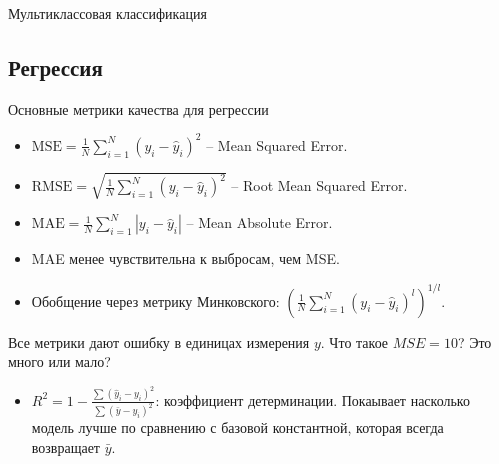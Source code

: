 \documentclass[9pt]{beamer}
\begin{document}
\begin{frame}{Мультиклассовая классификация}
\end{frame}

\subsection{Регрессия}

\begin{frame}{Основные метрики качества для регрессии}
\begin{itemize}
    \item $\text{MSE} = \frac{1}{N}\sum\limits_{i=1}^N (y_i - \hat y_i)^2$ -- Mean Squared Error.
    \item $\text{RMSE} = \sqrt{\frac{1}{N}\sum\limits_{i=1}^N (y_i - \hat y_i)^2}$ -- Root Mean Squared Error.
    \item $\text{MAE} = \frac{1}{N}\sum\limits_{i=1}^N |y_i - \hat y_i|$ -- Mean Absolute Error.
    \item MAE менее чувствительна к выбросам, чем MSE.
    \item Обобщение через метрику Минковского: $\left(\frac{1}{N}\sum\limits_{i=1}^N (y_i - \hat y_i)^l\right)^{1/l}$.
\end{itemize}
Все метрики дают ошибку в единицах измерения $y$. Что такое $MSE = 10$? Это много или мало?
\begin{itemize}
    \item $R^2 = 1 - \frac{\sum(\hat y_i - y_i)^2}{\sum(\bar y - y_i)^2}$: коэффициент детерминации. Покаывает насколько модель лучше по сравнению с базовой константной, которая всегда возвращает $\bar y$.
\end{itemize}
\end{frame}
\end{document}
